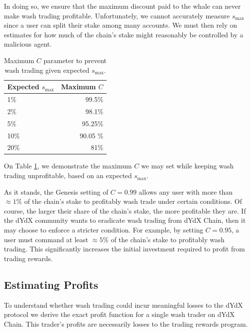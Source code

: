             In doing so, we ensure that the maximum discount paid to the whale can never make wash trading profitable. Unfortunately, we cannot accurately measure $s_{\text{max}}$ since a user can split their stake among many accounts. We must then rely on estimates for how much of the chain’s stake might reasonably be controlled by a malicious agent.
            
            \begin{table}[htp]
                \centering
                \begin{tabular}{l r}
                    \toprule
                    Expected $s_{\text{max}}$ & Maximum $C$ \\
                    \midrule
                    1\% & 99.5\% \\
                    2\% & 98.1\% \\
                    5\% & 95.25\% \\
                    10\% & 90.05 \% \\
                    20\% & 81\% \\
                    \bottomrule
                \end{tabular}
                \caption{Maximum $C$ parameter to prevent wash trading given expected $s_{\text{max}}$.}
                \label{tab:C_maxes}
            \end{table}

            On Table \ref{tab:C_maxes}, we demonstrate the maximum $C$ we may set while keeping wash trading unprofitable, based on an expected $s_{\text{max}}$. 

            As it stands, the Genesis setting of $C=0.99$ allows any user with more than $\approx 1\%$ of the chain's stake to profitably wash trade under certain conditions. Of course, the larger their share of the chain's stake, the more profitable they are. If the dYdX community wants to eradicate wash trading from dYdX Chain, then it may choose to enforce a stricter condition. For example, by setting $C=0.95$, a user must command at least $\approx 5\%$ of the chain's stake to profitably wash trading. This significantly increases the initial investment required to profit from trading rewards.

    \subsection{Estimating Profits}

        To understand whether wash trading could incur meaningful losses to the dYdX protocol we derive the exact profit function for a single wash trader on dYdX Chain. This trader's profits are necessarily losses to the trading rewards program.

